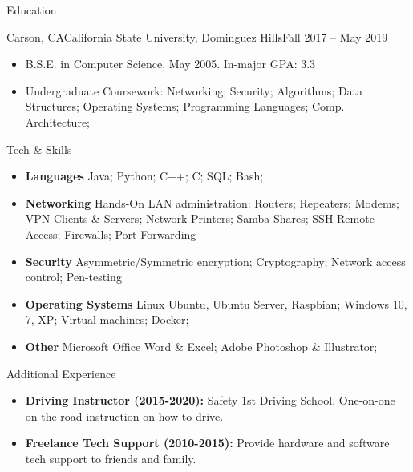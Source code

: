 \documentclass[]{mcdowellcv}
\begin{document}
	\begin{cvsection}{Education}
		\begin{cvsubsection}{Carson, CA}{California State University, Dominguez Hills}{Fall 2017 -- May 2019}
			\begin{itemize}
				\item B.S.E. in Computer Science, May 2005.  In-major GPA: 3.3
				\item Undergraduate Coursework: Networking; Security; Algorithms; Data Structures; Operating Systems; Programming Languages; Comp. Architecture; 
			\end{itemize}
		\end{cvsubsection}
	\end{cvsection}
	
	\begin{cvsection}{Tech & Skills}
		\begin{cvsubsection}{}{}{}
			\begin{itemize}
				\item \textbf{Languages} Java; Python; C++; C; SQL; Bash;
				\item \textbf{Networking} Hands-On LAN administration: Routers; Repeaters; Modems; VPN Clients & Servers; Network Printers; Samba Shares; SSH Remote Access; Firewalls; Port Forwarding 
				\item \textbf{Security} Asymmetric/Symmetric encryption; Cryptography; Network access control; Pen-testing
				\item \textbf{Operating Systems} Linux {Ubuntu, Ubuntu Server, Raspbian}; Windows {10, 7, XP}; Virtual machines; Docker;
				\item \textbf{Other} Microsoft Office Word & Excel; Adobe Photoshop & Illustrator;
			\end{itemize}
		\end{cvsubsection}
	\end{cvsection}
	
	\begin{cvsection}{Additional Experience}
		\begin{cvsubsection}{}{}{}	
			\begin{itemize}
				\item \textbf{Driving Instructor (2015-2020):} Safety 1st Driving School. One-on-one on-the-road instruction on how to drive.
				\item \textbf{Freelance Tech Support (2010-2015):} Provide hardware and software tech support to friends and family.
			\end{itemize}
		\end{cvsubsection}
	\end{cvsection}
	
\end{document}
